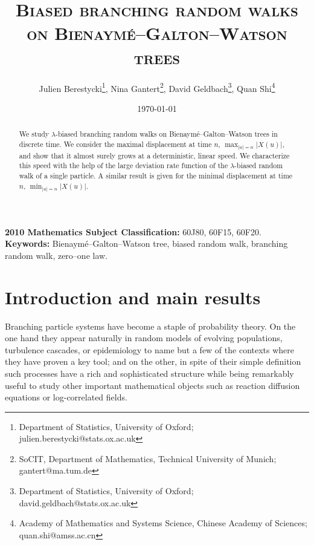 \documentclass[11 pt]{article}
\title{\textsc{Biased branching random walks\\  on Bienaymé--Galton--Watson trees}}
\author{Julien Berestycki\footnote{Department of Statistics, University of Oxford; julien.berestycki@stats.ox.ac.uk}, Nina Gantert\footnote{SoCIT, Department of Mathematics, Technical University of Munich; gantert@ma.tum.de}, David Geldbach\footnote{Department of Statistics, University of Oxford; {david.geldbach@stats.ox.ac.uk}}, 
	Quan Shi\footnote{Academy of Mathematics and Systems Science, Chinese Academy of Sciences; {quan.shi@amss.ac.cn}}}
\date{\today}
\theoremstyle{definition}
\numberwithin{equation}{section}
\begin{document}
\maketitle
\begin{abstract}
We study $\lambda$-biased branching random walks on Bienaymé--Galton--Watson trees in discrete time. We consider the maximal displacement at time $n$, $\max_{\vert u \vert =n} \vert X(u) \vert$, and show that it almost surely grows at a deterministic, linear speed. 
We characterize this speed with the help of the large deviation rate function of the $\lambda$-biased random walk of a single particle.
A similar result is given for the minimal displacement at time $n$, $\min_{\vert u \vert =n} \vert X(u) \vert$.
\end{abstract}
{\bf 2010 Mathematics Subject Classification:} 
 60J80, %
 60F15, %
 60F20. %
 \\
{\bf Keywords:} Bienaymé--Galton--Watson tree, biased random walk, branching random walk, zero--one law. 

\section{Introduction and main results}

Branching particle systems have become a staple of probability theory. On the one hand they appear naturally in random models of evolving populations, turbulence cascades, or epidemiology to name but a few of the contexts where they have proven a key tool; and on the other, in spite of their simple definition  such processes have a rich and sophisticated structure while being remarkably useful  to study other important mathematical objects such as reaction diffusion equations or log-correlated fields.
\end{document}
